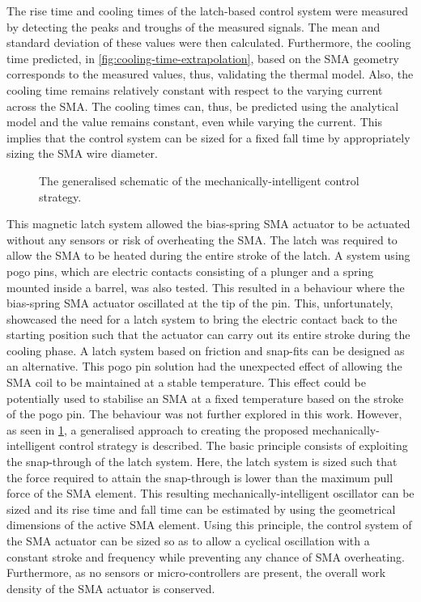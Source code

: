 The rise time and cooling times of the latch-based control system were measured by detecting the peaks and troughs of the measured signals. The mean and standard deviation of these values were then calculated. Furthermore, the cooling time predicted, in \cref{fig:cooling-time-extrapolation}, based on the SMA geometry corresponds to the measured values, thus, validating the thermal model. Also, the cooling time remains relatively constant with respect to the varying current across the SMA. The cooling times can, thus, be predicted using the analytical model and the value remains constant, even while varying the current. This implies that the control system can be sized for a fixed fall time by appropriately sizing the SMA wire diameter.

\begin{figure}[hbt!] %
  \centering
  
  \caption{The generalised schematic of the mechanically-intelligent control strategy.}
  \label{fig:mi-osc-flowchart}
\end{figure}

This magnetic latch system allowed the bias-spring SMA actuator to be actuated without any sensors or risk of overheating the SMA. The latch was required to allow the SMA to be heated during the entire stroke of the latch. A system using pogo pins, which are electric contacts consisting of a plunger and a spring mounted inside a barrel, was also tested. This resulted in a behaviour where the bias-spring SMA actuator oscillated at the tip of the pin. This, unfortunately, showcased the need for a latch system to bring the electric contact back to the starting position such that the actuator can carry out its entire stroke during the cooling phase. A latch system based on friction and snap-fits can be designed as an alternative. This pogo pin solution had the unexpected effect of allowing the SMA coil to be maintained at a stable temperature. This effect could be potentially used to stabilise an SMA at a fixed temperature based on the stroke of the pogo pin. The behaviour was not further explored in this work. However, as seen in \cref{fig:mi-osc-flowchart}, a generalised approach to creating the proposed mechanically-intelligent control strategy is described. The basic principle consists of exploiting the snap-through of the latch system. Here, the latch system is sized such that the force required to attain the snap-through is lower than the maximum pull force of the SMA element. This resulting mechanically-intelligent oscillator can be sized and its rise time and fall time can be estimated by using the geometrical dimensions of the active SMA element. Using this principle, the control system of the SMA actuator can be sized so as to allow a cyclical oscillation with a constant stroke and frequency while preventing any chance of SMA overheating. Furthermore, as no sensors or micro-controllers are present, the overall work density of the SMA actuator is conserved.


